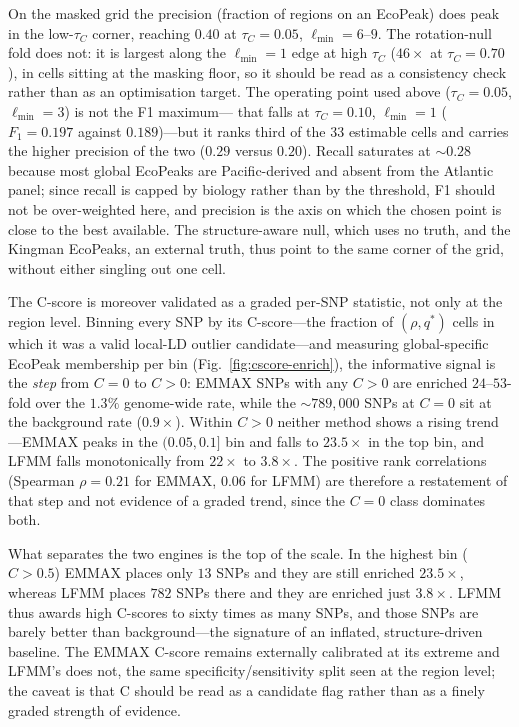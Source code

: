 \documentclass[11pt]{article}
\begin{document}
On the masked grid the precision (fraction of regions on an EcoPeak) does peak in the
low-$\tau_C$ corner, reaching $0.40$ at $\tau_C = 0.05$, $\ell_{\min} = 6$--$9$. The
rotation-null fold does not: it is largest along the $\ell_{\min} = 1$ edge at high
$\tau_C$ ($46\times$ at $\tau_C = 0.70$), in cells sitting at the masking floor, so it
should be read as a consistency check rather than as an optimisation target. The
operating point used above ($\tau_C = 0.05$, $\ell_{\min} = 3$) is not the F1 maximum---
that falls at $\tau_C = 0.10$, $\ell_{\min} = 1$ ($F_1 = 0.197$ against $0.189$)---but it
ranks third of the $33$ estimable cells and carries the higher precision of the two
($0.29$ versus $0.20$). Recall saturates at ${\sim}0.28$ because most global EcoPeaks are
Pacific-derived and absent from the Atlantic panel; since recall is capped by biology
rather than by the threshold, F1 should not be over-weighted here, and precision is the
axis on which the chosen point is close to the best available. The structure-aware null,
which uses no truth, and the Kingman EcoPeaks, an external truth, thus point to the same
corner of the grid, without either singling out one cell.

The C-score is moreover validated as a graded per-SNP statistic, not only at the region
level. Binning every SNP by its C-score---the fraction of $(\rho, q^*)$ cells in which it
was a valid local-LD outlier candidate---and measuring global-specific EcoPeak membership
per bin (Fig.~\ref{fig:cscore-enrich}), the informative signal is the \emph{step} from
$C = 0$ to $C > 0$: EMMAX SNPs with any $C > 0$ are enriched $24$--$53$-fold over the
$1.3\%$ genome-wide rate, while the ${\sim}789{,}000$ SNPs at $C = 0$ sit at the
background rate ($0.9\times$). Within $C > 0$ neither method shows a rising trend---EMMAX
peaks in the $(0.05, 0.1]$ bin and falls to $23.5\times$ in the top bin, and LFMM falls
monotonically from $22\times$ to $3.8\times$. The positive rank correlations
(Spearman $\rho = 0.21$ for EMMAX, $0.06$ for LFMM) are therefore a restatement of that
step and not evidence of a graded trend, since the $C = 0$ class dominates both.

What separates the two engines is the top of the scale. In the highest bin ($C > 0.5$)
EMMAX places only $13$ SNPs and they are still enriched $23.5\times$, whereas LFMM places
$782$ SNPs there and they are enriched just $3.8\times$. LFMM thus awards high C-scores to
sixty times as many SNPs, and those SNPs are barely better than background---the signature
of an inflated, structure-driven baseline. The EMMAX C-score remains externally calibrated
at its extreme and LFMM's does not, the same specificity/sensitivity split seen at the
region level; the caveat is that C should be read as a candidate flag rather than as a
finely graded strength of evidence.
\end{document}
